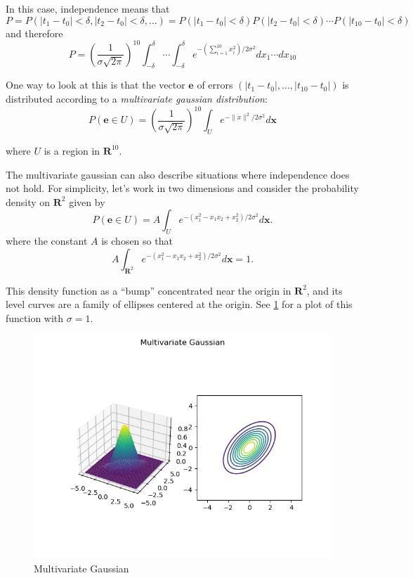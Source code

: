 \documentclass[
  oneside]{scrbook}
\begin{document}
In this case, independence means that \[
P=P(|t_1-t_0|<\delta,|t_2-t_0|<\delta,\ldots) = P(|t_1-t_0|<\delta)P(|t_2-t_0|<\delta)\cdots P(|t_{10}-t_{0}|<\delta)
\] and therefore \[
P = \left(\frac{1}{\sigma\sqrt{2\pi}}\right)^{10}\int_{-\delta}^{\delta}\cdots\int_{-\delta}^{\delta}
e^{-(\sum_{i=1}^{10} x_i^2)/2\sigma^2} dx_1\cdots dx_{10}
\]

One way to look at this is that the vector \(\mathbf{e}\) of errors
\((|t_1-t_0|,\ldots,|t_{10}-t_0|)\) is distributed according to a
\emph{multivariate gaussian distribution}: \begin{equation}
P(\mathbf{e}\in U) =\left(\frac{1}{\sigma\sqrt{2\pi}}\right)^{10}\int_{U} 
e^{-\|x\|^2/2\sigma^2} d\mathbf{x}
\label{eq:multivariategaussian}\end{equation}

where \(U\) is a region in \(\mathbf{R}^{10}\).

The multivariate gaussian can also describe situations where
independence does not hold. For simplicity, let's work in two dimensions
and consider the probability density on \(\mathbf{R}^{2}\) given by \[
P(\mathbf{e}\in U) = A\int_{U} e^{-(x_1^2-x_1x_2+x_2^2)/2\sigma^2} d\mathbf{x}.
\] where the constant \(A\) is chosen so that \[
A\int_{\mathbf{R}^{2}}e^{-(x_1^2-x_1x_2+x_2^2)/2\sigma^2}d\mathbf{x} = 1.
\]

This density function as a ``bump'' concentrated near the origin in
\(\mathbf{R}^{2}\), and its level curves are a family of ellipses
centered at the origin. See \cref{fig:multivariate} for a plot of this
function with \(\sigma=1\).

\begin{figure}
\hypertarget{fig:multivariate}{%
\centering
\includegraphics{img/ellipse.png}
\caption{Multivariate Gaussian}\label{fig:multivariate}
}
\end{figure}
\end{document}
